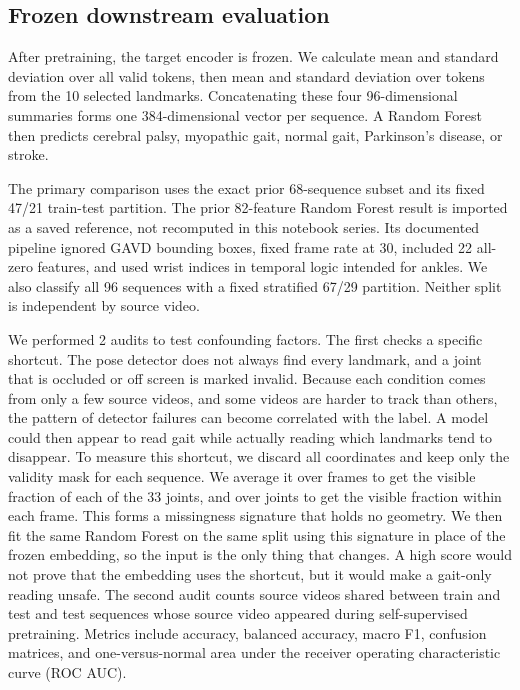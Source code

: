 \documentclass[conference]{IEEEtran}
\begin{document}
\subsection{Frozen downstream evaluation}
After pretraining, the target encoder is frozen. We calculate mean and standard deviation over all valid tokens, then mean and standard deviation over tokens from the 10 selected landmarks. Concatenating these four 96-dimensional summaries forms one 384-dimensional vector per sequence. A Random Forest then predicts cerebral palsy, myopathic gait, normal gait, Parkinson's disease, or stroke.

The primary comparison uses the exact prior 68-sequence subset and its fixed 47/21 train-test partition. The prior 82-feature Random Forest result is imported as a saved reference, not recomputed in this notebook series. Its documented pipeline ignored GAVD bounding boxes, fixed frame rate at 30, included 22 all-zero features, and used wrist indices in temporal logic intended for ankles. We also classify all 96 sequences with a fixed stratified 67/29 partition. Neither split is independent by source video.

We performed 2 audits to test confounding factors. The first checks a specific shortcut. The pose detector does not always find every landmark, and a joint that is occluded or off screen is marked invalid. Because each condition comes from only a few source videos, and some videos are harder to track than others, the pattern of detector failures can become correlated with the label. A model could then appear to read gait while actually reading which landmarks tend to disappear. To measure this shortcut, we discard all coordinates and keep only the validity mask for each sequence. We average it over frames to get the visible fraction of each of the 33 joints, and over joints to get the visible fraction within each frame. This forms a missingness signature that holds no geometry. We then fit the same Random Forest on the same split using this signature in place of the frozen embedding, so the input is the only thing that changes. A high score would not prove that the embedding uses the shortcut, but it would make a gait-only reading unsafe. The second audit counts source videos shared between train and test and test sequences whose source video appeared during self-supervised pretraining. Metrics include accuracy, balanced accuracy, macro F1, confusion matrices, and one-versus-normal area under the receiver operating characteristic curve (ROC AUC).
\end{document}
